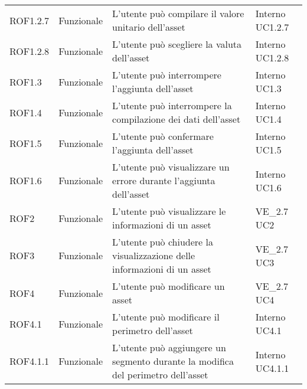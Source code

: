\begin{longtable}{p{2cm}!{\VRule[1pt]}p{2cm}!{\VRule[1pt]}p{5cm}!{\VRule[1pt]}p{1.5cm}}
 \\
ROF1.2.7&Funzionale\newline  & L'utente può compilare il valore unitario dell'asset & Interno \newline UC1.2.7
 \\
ROF1.2.8&Funzionale\newline  & L'utente può scegliere la valuta dell'asset & Interno \newline UC1.2.8
 \\
ROF1.3&Funzionale\newline  & L'utente può interrompere l'aggiunta dell'asset & Interno \newline UC1.3
 \\
ROF1.4&Funzionale\newline  & L'utente può interrompere la compilazione dei dati dell'asset & Interno \newline UC1.4
 \\
ROF1.5&Funzionale\newline  & L'utente può confermare l'aggiunta dell'asset & Interno \newline UC1.5
 \\
ROF1.6&Funzionale\newline  & L'utente può visualizzare un errore durante l'aggiunta dell'asset & Interno \newline UC1.6
 \\
ROF2&Funzionale\newline  & L'utente può visualizzare le informazioni di un asset & VE_2.7 \newline UC2
\\
ROF3&Funzionale\newline  & L'utente può chiudere la visualizzazione delle informazioni di un asset & VE_2.7 \newline UC3
\\
ROF4&Funzionale\newline  & L'utente può modificare un asset & VE_2.7 \newline UC4
\\
ROF4.1&Funzionale\newline  & L'utente può modificare il perimetro dell'asset & Interno \newline UC4.1
\\
ROF4.1.1&Funzionale\newline  & L'utente può aggiungere un segmento durante la modifica del perimetro dell'asset & Interno \newline UC4.1.1
\\

\end{longtable}
